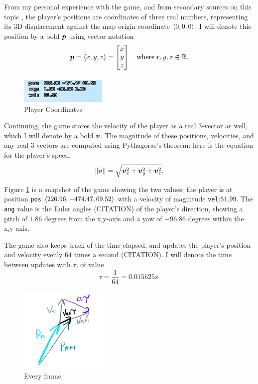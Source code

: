 From my personal experience with the game, and from secondary sources on this topic \parencite{Kered13}, the player's positions are coordinates of three real numbers, representing its 3D displacement against the map origin coordinate $\left\langle 0,0,0 \right\rangle$. I will denote this position by a bold $\boldsymbol{p}$ using vector notation
\[
    \boldsymbol{p} = \left\langle x, y, z \right\rangle = \begin{bmatrix} x\\y\\z \end{bmatrix} \quad \text{where} \, x, y, z \in  \mathbb{R}.
\]

\begin{figure}
    \includegraphics[width=0.37\textwidth,right]{assets/1coords.png}
    \caption{Player Coordinates}
    \label{fig:1coords}
\end{figure}

Continuing, the game stores the velocity of the player as a real 3-vector as well, which I will denote by a bold $\boldsymbol{v}$. The magnitude of these positions, velocities, and any real 3-vectors are computed using Pythagoras's theorem: here is the equation for the player's speed,
\[
    \|\boldsymbol{v}\| = \sqrt{\boldsymbol{v}_x^2+\boldsymbol{v}_y^2+\boldsymbol{v}_z^2}.
\]


Figure \ref{fig:1coords} is a snapshot of the game showing the two values; the player is at position \verb|pos|:$\left\langle 226.96, -474.47, 69.52 \right\rangle$ with a velocity of magnitude \verb|vel|:$51.99$. The \verb|ang| value is the Euler angles (CITATION) of the player's direction, showing a pitch of $1.86$ degrees from the x,y-axis and a yaw of $-96.86$ degrees within the x,y-axis.


The game also keeps track of the time elapsed, and updates the player's position and velocity evenly $64$ times a second (CITATION). I will denote the time between updates with $\tau$, of value
\[
    \tau = \frac{1}{64} = 0.015625 \si{s}.
\]

\begin{figure}
    \includegraphics[width=0.37\textwidth,right]{assets/1vecadd.png}
    \caption{Every frame}
    \label{fig:1vecadd}
\end{figure}

